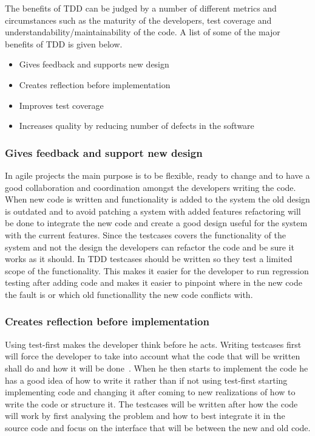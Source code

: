 The benefits of TDD can be judged by a number of different metrics and circumstances such as the maturity of the developers, test coverage and understandability/maintainability of the code. A list of some of the major benefits of TDD is given below.

\begin{itemize}
\item Gives feedback and supports new design
\item Creates reflection before implementation
\item Improves test coverage
\item Increases quality by reducing number of defects in the software
\end{itemize}

\subsubsection*{Gives feedback and support new design}
In agile projects the main purpose is to be flexible, ready to change and to have a good collaboration and coordination amongst the developers writing the code. When new code is written and functionality is added to the system the old design is outdated and to avoid patching a system with added features refactoring will be done to integrate the new code and create a good design useful for the system with the current features. 
Since the testcases covers the functionality of the system and not the design the developers can refactor the code and be sure it works as it should. 
In TDD testcases should be written so they test a limited scope of the functionality. This makes it easier for the developer to run regression testing after adding code and makes it easier to pinpoint where in the new code the fault is or which old functionallity the new code conflicts with.

\subsubsection*{Creates reflection before implementation}
Using test-first makes the developer think before he acts. Writing testcases first will force the developer to take into account what the code that will be written shall do and how it will be done~\cite{erdogmus}. When he then starts to implement the code he has a good idea of how to write it rather than if not using test-first starting implementing code and changing it after coming to new realizations of how to write the code or structure it. The testcases will be written after how the code will work by first analysing the problem and how to best integrate it in the source code and focus on the interface that will be between the new and old code.

